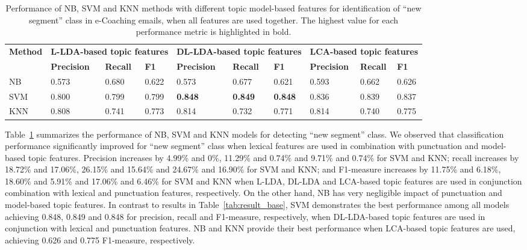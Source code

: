 \documentclass{amia}
\begin{document}
\begin{table}[ht]
\centering
\caption{Performance of NB, SVM and KNN methods with different topic model-based features for identification of ``new segment'' class in e-Coaching emails, when all features are used together. The highest value for each performance metric is highlighted in bold.}
\label{tab:result_boundary}
  \begin{tabular}{|l|l|l|l|l|l|l|l|l|l|}
  \hline
   \multirow{2}{*}{\textbf{Method}} & \multicolumn{3}{|c|}{\textbf{L-LDA-based topic features}} & \multicolumn{3}{|c|}{\textbf{DL-LDA-based topic features}}  & \multicolumn{3}{|c|}{\textbf{LCA-based topic features}} \\\cline{2-10} & \textbf{Precision}  & \textbf{Recall} & \textbf{F1} & \textbf{Precision}  & \textbf{Recall} & \textbf{F1} & \textbf{Precision}  & \textbf{Recall} & \textbf{F1}\\ \hline  
    
 NB & 0.573 & 0.680 & 0.622 & 0.573 & 0.677 & 0.621 & 0.593 & 0.662 & 0.626 \\ \hline
 SVM & 0.800 & 0.799 & 0.799 & \textbf{0.848} & \textbf{0.849} & \textbf{0.848} & 0.836 & 0.839 & 0.837  \\ \hline
 KNN & 0.808 & 0.741 & 0.773 & 0.814 & 0.732 & 0.771 & 0.814 & 0.740 & 0.775 \\ \hline
  \end{tabular}
\end{table} 

Table~\ref{tab:result_boundary} summarizes the performance of NB, SVM and KNN models for detecting ``new segment'' class. We observed that classification performance significantly improved for ``new segment'' class when lexical features are used in combination with punctuation and model-based topic features. Precision increases by 4.99\% and 0\%, 11.29\% and 0.74\% and 9.71\% and 0.74\% for SVM and KNN; recall increases by 18.72\% and 17.06\%, 26.15\% and 15.64\% and 24.67\% and 16.90\% for SVM and KNN; and F1-measure increases by 11.75\% and 6.18\%, 18.60\% and 5.91\% and 17.06\% and 6.46\% for SVM and KNN when L-LDA, DL-LDA and LCA-based topic features are used in conjunction combination with lexical and punctuation features, respectively. On the other hand, NB has very negligible impact of punctuation and model-based topic features. In contrast to results in Table~\ref{tab:result_base}, SVM demonstrates the best performance among all models achieving 0.848, 0.849 and 0.848 for precision, recall and F1-measure, respectively, when DL-LDA-based topic features are used in conjunction with lexical and punctuation features. NB and KNN provide their best performance when LCA-based topic features are used, achieving 0.626 and 0.775 F1-measure, respectively.\\ 
              
\end{document}
